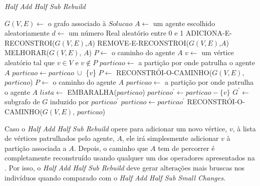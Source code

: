 \begin{algorithm}                   %
	\caption{\textit{Half Add Half Sub Rebuild}}          %
	\label{rebuild}                           %
	\begin{algorithmic}[1]                   %
		\newline
		\State $G(V,E) \gets $ o grafo associado à $Solucao$
		\State $A \gets $ um agente escolhido aleatoriamente
		\State $d \gets $ um número Real aleatório entre 0 e 1
			\State ADICIONA-E-RECONSTROI($G(V,E)$,$A$)
		\Else
			\State REMOVE-E-RECONSTROI($G(V,E)$,$A$)
		\EndIf
		\State MELHORAR($G(V,E)$, $A$)
		\EndProcedure
		\State $P \gets $ o caminho do agente $A$
		\State $v \gets $ um vértice aleatório tal que $v \in V$ e $v \notin P$
		\State $particao \gets $ a partição por onde patrulha o agente $A$
		\State $particao \gets particao\ \cup $ \{$v$\}
		\State $P \gets $ RECONSTRÓI-O-CAMINHO($G(V,E)$, $particao$)
		\EndProcedure
		\State $P \gets $ o caminho do agente $A$
		\State $particao \gets $ a partição por onde patrulha o agente $A$
		\State $lista \gets $ EMBARALHA($particao$) 
			\State $particao^{\prime} \gets particao - \{v\}$
			\State $G^{\prime} \gets $ subgrafo de $G$ induzido por $particao^{\prime}$
		\EndFor
		\State $particao \gets particao^{\prime}$
		\State RECONSTRÓI-O-CAMINHO($G(V,E)$, $particao$)
		\EndProcedure
	\end{algorithmic}
\end{algorithm}

Caso o \textit{Half Add Half Sub Rebuild} opere para adicionar um novo vértice, 
$v$, à lista de vértices patrulhados pelo agente, $A$, ele irá simplesmente 
adicionar $v$ à partição associada a $A$. Depois, o caminho que $A$ tem de 
percorrer é completamente reconstruído usando qualquer um dos operadores 
apresentados na . Por isso, o 
\textit{Half Add Half Sub Rebuild} deve gerar alterações mais bruscas nos 
indivíduos quando comparado com o \textit{Half Add Half Sub Small Changes}.

